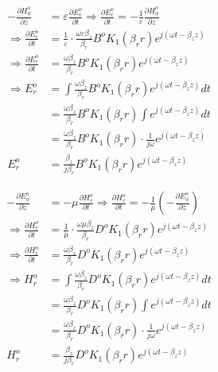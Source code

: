 \begin{equation}
	\begin{split}
		- \frac{\partial H_\phi^o}{\partial z} &= \varepsilon \frac{\partial E_r^o}{\partial t} 
		\Rightarrow \frac{\partial E_r^o}{\partial t} = -\frac{1}{\varepsilon} \frac{\partial H_\phi^o}{\partial z} \\
		\Rightarrow \frac{\partial E_r^o}{\partial t} &= \frac{1}{\varepsilon} \cdot \frac{\omega \varepsilon \beta_z}{\beta_r} B^o K_1(\beta_r r) e^{j(\omega t - \beta_z z)} \\
		\Rightarrow \frac{\partial E_r^o}{\partial t} &= \frac{\omega \beta_z}{\beta_r} B^o K_1(\beta_r r) e^{j(\omega t - \beta_z z)} \\
		\Rightarrow E_r^o &= \int \frac{\omega \beta_z}{\beta_r} B^o K_1(\beta_r r) e^{j(\omega t - \beta_z z)} dt \\
		&= \frac{\omega \beta_z}{\beta_r} B^o K_1(\beta_r r) \int e^{j(\omega t - \beta_z z)} dt \\
		&= \frac{\omega \beta_z}{\beta_r} B^o K_1(\beta_r r) \cdot \frac{1}{j\omega} e^{j(\omega t - \beta_z z)} \\
		E_r^o &= \frac{\beta_z}{j \beta_r} B^o K_1(\beta_r r) e^{j(\omega t - \beta_z z)}
	\end{split}
	\label{eq:Er_o}
\end{equation}

\begin{equation}
	\begin{split}
		- \frac{\partial E_\phi^o}{\partial z} &= -\mu \frac{\partial H_r^o}{\partial t} 
		\Rightarrow \frac{\partial H_r^o}{\partial t} = -\frac{1}{\mu} \left( -\frac{\partial E_\phi^o}{\partial z} \right) \\
		\Rightarrow \frac{\partial H_r^o}{\partial t} &= \frac{1}{\mu} \cdot \frac{\omega \mu \beta_z}{\beta_r} D^o K_1(\beta_r r) e^{j(\omega t - \beta_z z)} \\
		\Rightarrow \frac{\partial H_r^o}{\partial t} &= \frac{\omega \beta_z}{\beta_r} D^o K_1(\beta_r r) e^{j(\omega t - \beta_z z)} \\
		\Rightarrow H_r^o &= \int \frac{\omega \beta_z}{\beta_r} D^o K_1(\beta_r r) e^{j(\omega t - \beta_z z)} dt \\
		&= \frac{\omega \beta_z}{\beta_r} D^o K_1(\beta_r r) \int e^{j(\omega t - \beta_z z)} dt \\
		&= \frac{\omega \beta_z}{\beta_r} D^o K_1(\beta_r r) \cdot \frac{1}{j\omega} e^{j(\omega t - \beta_z z)} \\
		H_r^o &= \frac{\beta_z}{j \beta_r} D^o K_1(\beta_r r) e^{j(\omega t - \beta_z z)}
	\end{split}
	\label{eq:Hr_o}
\end{equation}

